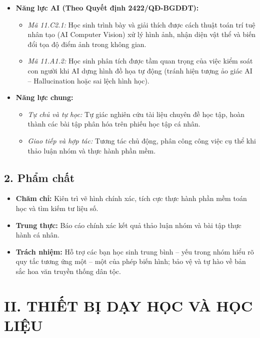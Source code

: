 \documentclass[12pt, a4paper]{article}
\begin{document}
\begin{itemize}[leftmargin=1.2cm]
    \item \textbf{Năng lực AI (Theo Quyết định 2422/QĐ-BGDĐT):}
    \begin{itemize}[leftmargin=0.6cm]
        \item \textit{Mã 11.C2.1:} Học sinh trình bày và giải thích được cách thuật toán trí tuệ nhân tạo (AI Computer Vision) xử lý hình ảnh, nhận diện vật thể và biến đổi tọa độ điểm ảnh trong không gian.
        \item \textit{Mã 11.A1.2:} Học sinh phân tích được tầm quan trọng của việc kiểm soát con người khi AI dựng hình đồ họa tự động (tránh hiện tượng ảo giác AI -- Hallucination hoặc sai lệch hình học).
    \end{itemize}

    \item \textbf{Năng lực chung:}
    \begin{itemize}[leftmargin=0.6cm]
        \item \textit{Tự chủ và tự học:} Tự giác nghiên cứu tài liệu chuyên đề học tập, hoàn thành các bài tập phân hóa trên phiếu học tập cá nhân.
        \item \textit{Giao tiếp và hợp tác:} Tương tác chủ động, phân công công việc cụ thể khi thảo luận nhóm và thực hành phần mềm.
    \end{itemize}
\end{itemize}

\subsection*{2. Phẩm chất}

\begin{itemize}[leftmargin=1.2cm]
    \item \textbf{Chăm chỉ:} Kiên trì vẽ hình chính xác, tích cực thực hành phần mềm toán học và tìm kiếm tư liệu số.
    \item \textbf{Trung thực:} Báo cáo chính xác kết quả thảo luận nhóm và bài tập thực hành cá nhân.
    \item \textbf{Trách nhiệm:} Hỗ trợ các bạn học sinh trung bình -- yếu trong nhóm hiểu rõ quy tắc tương ứng một -- một của phép biến hình; bảo vệ và tự hào về bản sắc hoa văn truyền thống dân tộc.
\end{itemize}

\section*{II. THIẾT BỊ DẠY HỌC VÀ HỌC LIỆU}
\end{document}
